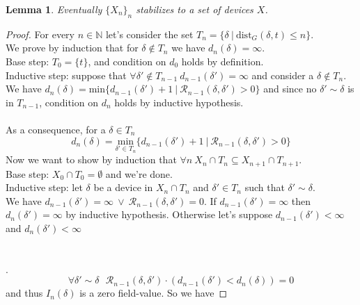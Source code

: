\documentclass{article}
\theoremstyle{plain}
\newtheorem{lem}[teo]{Lemma}
\theoremstyle{definition}
\theoremstyle{remark}
\begin{document}
\begin{lem}
 Eventually $\{X_n\}_n$ stabilizes to a set of devices $X$.
\end{lem}
\begin{proof}
For every $n\in\mathbb{N}$ let's consider the set $T_n=\{\delta\ |\ \mathrm{dist}_G(\delta, t)\leq n\}$.\\
We prove by induction that for $\delta\not\in T_n $ we have $d_n(\delta)=\infty$.\\
Base step: $T_0=\{t\}$, and condition on $d_0$ holds by definition.\\
Inductive step: suppose that $\forall \delta'\not\in T_{n-1}\ d_{n-1}(\delta')=\infty$ and consider a  $\delta \not\in T_n$. We have  $d_n(\delta)= \mathrm{min}\big\{d_{n-1}(\delta') + 1\ |\  \mathcal{R}_{n-1}(\delta, \delta')>0\big\}$ and since no $\delta'\sim \delta$ is in $T_{n-1}$, condition on $d_n$ holds by inductive hypothesis.\\ \\
As a consequence, for a $\delta\in  T_n$ 
\begin{equation*}
d_n(\delta) =  \underset{\delta'\in T_n}{\mathrm{min}}\big\{d_{n-1}(\delta') + 1\ |\  \mathcal{R}_{n-1}(\delta, \delta')>0\big\}
\end{equation*}
 Now we want to show by induction that $\displaystyle{\forall n\  X_n\cap T_n \subseteq X_{n+1} \cap T_{n+1}}$.\\ 
Base step: $X_0\cap T_0 = \emptyset$ and we're done.\\
 Inductive step: let  $\delta$ be a device in $X_n\cap T_n$ and $\delta'\in T_n$ such that $\delta'\sim\delta$. \\
We have $\displaystyle{d_{n-1}(\delta')=\infty\ \lor\ \mathcal{R}_{n-1}(\delta, \delta') = 0}$. If $d_{n-1}(\delta')=\infty$ then $d_n(\delta')=\infty$ by inductive hypothesis. Otherwise let's suppose $d_{n-1}(\delta')<\infty$ and $d_n(\delta')<\infty$ 
\\ \\ \\.
\begin{equation*}
\forall\delta'\sim\delta\ \ \ \mathcal{R}_{n-1}(\delta, \delta')\cdot(d_{n-1}(\delta')<d_{n}(\delta)) = 0
\end{equation*}
and thus $I_n(\delta)$ is a zero field-value.
So we have 

\end{proof}
\end{document}
